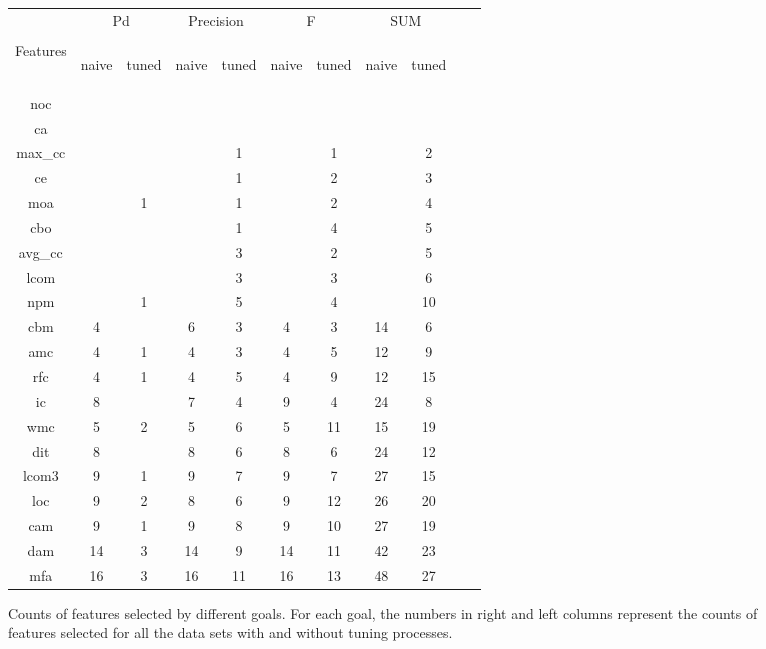 \documentclass{acm_proc_article-sp}
\begin{document}
\begin{figure}[!ht]

\renewcommand{\baselinestretch}{0.8}
\scriptsize
\centering
  \begin{tabular}{c|c c|c c|c c|c c| c c }
  
    & \multicolumn{2}{c|}{Pd} &  \multicolumn{2}{c|}{Precision} & \multicolumn{2}{c|}{F} &  \multicolumn{2}{c|}{SUM}\\
 &&&&&&&&\\
Features& \begin{sideways}naive\end{sideways}
& \begin{sideways}tuned\end{sideways}
& \begin{sideways}naive\end{sideways}
& \begin{sideways}tuned\end{sideways}
& \begin{sideways}naive\end{sideways}
& \begin{sideways}tuned\end{sideways}
& \begin{sideways}naive\end{sideways}
& \begin{sideways}tuned\end{sideways}
\\\hline
noc& & & & & & &  & \\
ca& & & & & & &  & \\
max\_cc& & & & 1& & 1&  & 2\\
ce& & & & 1& & 2&  & 3\\
moa& & 1& & 1& & 2&  & 4\\
cbo& & & & 1& & 4&  & 5\\
avg\_cc& & & & 3& & 2&  & 5\\
lcom& & & & 3& & 3&  & 6\\
npm& & 1& & 5& & 4&  & 10\\
cbm& 4& & 6& 3& 4& 3& 14 & 6\\
amc& 4& 1& 4& 3& 4& 5& 12 & 9\\
rfc& 4& 1& 4& 5& 4& 9& 12 & 15\\
ic& 8& & 7& 4& 9& 4& 24 & 8\\
wmc& 5& 2& 5& 6& 5& 11& 15 & 19\\
dit& 8& & 8& 6& 8& 6& 24 & 12\\
lcom3& 9& 1& 9& 7& 9& 7& 27 & 15\\
loc& 9& 2& 8& 6& 9& 12& 26 & 20\\
cam& 9& 1& 9& 8& 9& 10& 27 & 19\\
dam& 14& 3& 14& 9& 14& 11& 42 & 23\\
mfa& 16& 3& 16& 11& 16& 13& 48 & 27\\

  \end{tabular}
    \caption{Counts of features selected by different goals. For each goal, the numbers in right and left columns represent the counts of features selected for all the data sets with and without tuning processes.}
\end{figure}
\end{document}
